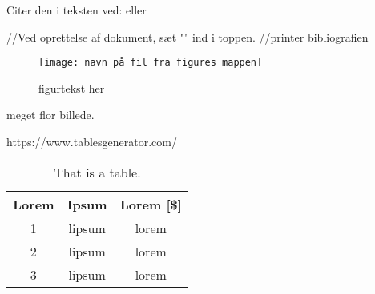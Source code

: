Citer den i teksten ved:
\cite{china_too_many}
eller 


//Ved oprettelse af dokument, sæt "" ind i toppen.
//\printbibliography printer bibliografien


\begin{figure}[H]
\centering
\texttt{[image: navn på fil fra figures mappen]}
\caption{figurtekst her}
\end{figure}


\caption{meget flor billede. \cite{kildehenvisning }}


https://www.tablesgenerator.com/

\begin{table}[H]
    \centering
    \caption{That is a table.}
    \begin{tabular}{|c|c|c|}
    \centering
    \textbf{Lorem} & \textbf{Ipsum} & \textbf{Lorem [\$]} \\ \hline \hline
1   & lipsum    & lorem     \\ \hline   
2   & lipsum    & lorem   \\ \hline
3   & lipsum    & lorem  
    \end{tabular}
    \label{tab:table1}
\end{table}


